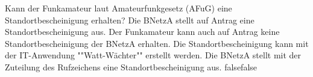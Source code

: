     {Kann der Funkamateur laut Amateurfunkgesetz (AFuG) eine Standortbescheinigung erhalten?}
    {Die BNetzA stellt auf Antrag eine Standortbescheinigung aus.}
    {Der Funkamateur kann auch auf Antrag keine Standortbescheinigung der BNetzA erhalten.}
    {Die Standortbescheinigung kann mit der IT-Anwendung ""Watt-Wächter"" erstellt werden.}
    {Die BNetzA stellt mit der Zuteilung des Rufzeichens eine Standortbescheinigung aus.}
    {false}{false}